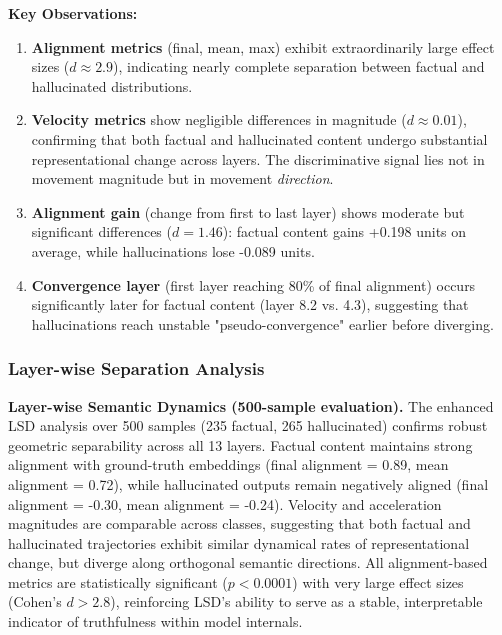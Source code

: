 \documentclass[11pt]{article}
\begin{document}
\textbf{Key Observations:}

\begin{enumerate}[leftmargin=*]
    \item \textbf{Alignment metrics} (final, mean, max) exhibit extraordinarily large effect sizes ($d \approx 2.9$), indicating nearly complete separation between factual and hallucinated distributions.
    
    \item \textbf{Velocity metrics} show negligible differences in magnitude ($d \approx 0.01$), confirming that both factual and hallucinated content undergo substantial representational change across layers. The discriminative signal lies not in movement magnitude but in movement \emph{direction}.
    
    \item \textbf{Alignment gain} (change from first to last layer) shows moderate but significant differences ($d = 1.46$): factual content gains +0.198 units on average, while hallucinations lose -0.089 units.
    
    \item \textbf{Convergence layer} (first layer reaching 80\% of final alignment) occurs significantly later for factual content (layer 8.2 vs. 4.3), suggesting that hallucinations reach unstable "pseudo-convergence" earlier before diverging.
\end{enumerate}

\subsubsection{Layer-wise Separation Analysis}
\noindent\textbf{Layer-wise Semantic Dynamics (500-sample evaluation).}
The enhanced LSD analysis over 500 samples (235 factual, 265 hallucinated) confirms robust geometric separability across all 13 layers.
Factual content maintains strong alignment with ground-truth embeddings (final alignment = 0.89, mean alignment = 0.72), while hallucinated outputs remain negatively aligned (final alignment = -0.30, mean alignment = -0.24).
Velocity and acceleration magnitudes are comparable across classes, suggesting that both factual and hallucinated trajectories exhibit similar dynamical rates of representational change, but diverge along orthogonal semantic directions.
All alignment-based metrics are statistically significant ($p < 0.0001$) with very large effect sizes (Cohen’s $d > 2.8$), reinforcing LSD’s ability to serve as a stable, interpretable indicator of truthfulness within model internals.
\end{document}
